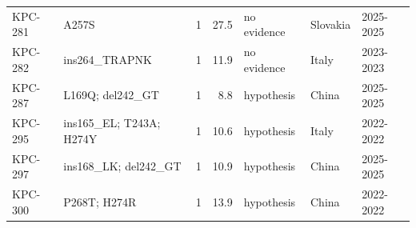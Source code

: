 \begin{longtable}{@{}l p{4.6cm} r r l l l@{}}
KPC-281 & A257S & 1 & 27.5 & no evidence & Slovakia & 2025-2025 \\
KPC-282 & ins264\_TRAPNK & 1 & 11.9 & no evidence & Italy & 2023-2023 \\
KPC-287 & L169Q; del242\_GT & 1 & 8.8 & hypothesis & China & 2025-2025 \\
KPC-295 & ins165\_EL; T243A; H274Y & 1 & 10.6 & hypothesis & Italy & 2022-2022 \\
KPC-297 & ins168\_LK; del242\_GT & 1 & 10.9 & hypothesis & China & 2025-2025 \\
KPC-300 & P268T; H274R & 1 & 13.9 & hypothesis & China & 2022-2022 \\
\end{longtable}
